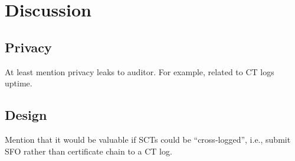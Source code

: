 \section{Discussion} \label{sec:discussion}

\subsection{Privacy}
At least mention privacy leaks to auditor. For example, related to CT logs uptime.

\subsection{Design}
Mention that it would be valuable if SCTs could be ``cross-logged'', i.e.,
submit SFO rather than certificate chain to a CT log.
